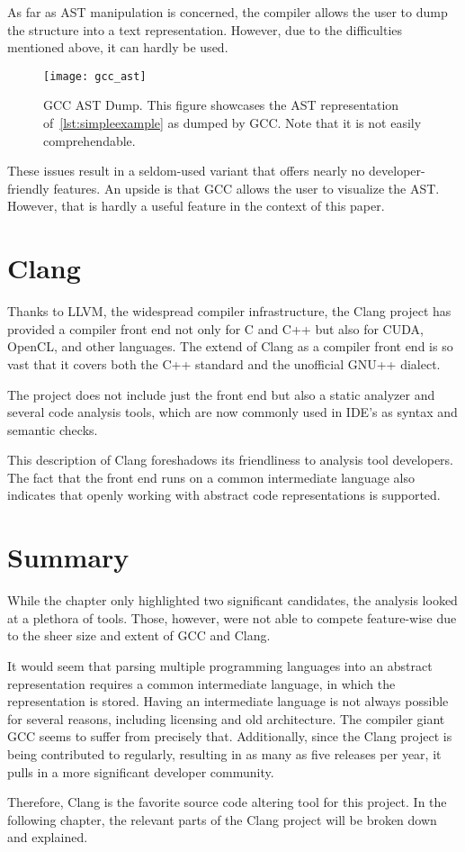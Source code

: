 As far as AST manipulation is concerned, the compiler allows the user to dump 
the structure into a text representation. 
However, due to the difficulties mentioned above, it can hardly be used.

\begin{figure}[p]\centering
\texttt{[image: gcc\_ast]}
\caption{GCC AST Dump. This figure showcases 
the AST representation of~\ref{lst:simpleexample}
as dumped by GCC. Note that it is not easily comprehendable.}
\label{img:gcc}
\end{figure}

These issues result in a seldom-used variant that offers nearly 
no developer-friendly features. 
An upside is that GCC allows the user to visualize the AST. 
However, that is hardly a useful feature in the context of this paper.

\section{Clang}

Thanks to LLVM, the widespread compiler infrastructure, the Clang project 
has provided a compiler front end not only for C and C++ but also 
for CUDA, OpenCL, and other languages. 
The extend of Clang as a compiler front end is so vast that it covers 
both the C++ standard and the unofficial GNU++ dialect.

The project does not include just the front end but also a static analyzer 
and several code analysis tools, which are now commonly used in IDE's as 
syntax and semantic checks. 

This description of Clang foreshadows its friendliness to analysis tool developers. 
The fact that the front end runs on a common intermediate language also indicates 
that openly working with abstract code representations is supported.


\section{Summary}

While the chapter only highlighted two significant candidates, the analysis 
looked at a plethora of tools. 
Those, however, were not able to compete feature-wise due to the sheer size 
and extent of GCC and Clang. 

It would seem that parsing multiple programming languages into an abstract 
representation requires a common intermediate language, in which 
the representation is stored. 
Having an intermediate language is not always possible for several reasons, 
including licensing and old architecture. 
The compiler giant GCC seems to suffer from precisely that.
Additionally, since the Clang project is being contributed to regularly, 
resulting in as many as five releases per year, 
it pulls in a more significant developer community. 

Therefore, Clang is the favorite source code altering tool for this project. 
In the following chapter, the relevant parts of the Clang project 
will be broken down and explained.